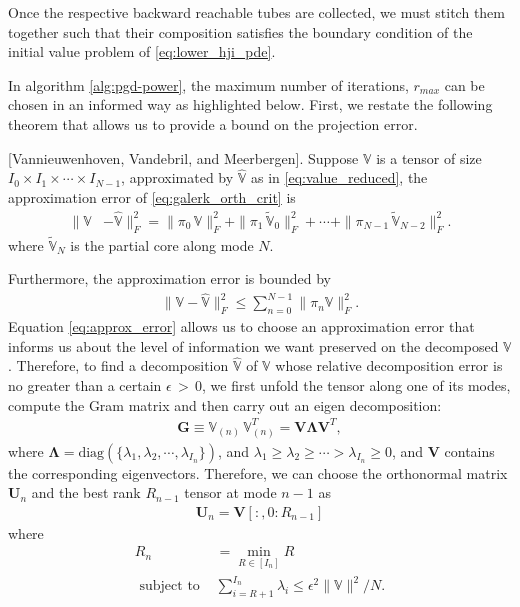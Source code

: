 Once the respective backward reachable tubes are collected, we must stitch them together such that their composition satisfies the boundary condition of the initial value problem of \eqref{eq:lower_hji_pde}. 

In algorithm \ref{alg:pgd-power}, the maximum number of iterations, $r_{max}$ can be chosen in an informed way as highlighted below. First, we restate the following theorem  that allows us to provide a bound on the projection error.
%
\begin{theorem}{[Vannieuwenhoven, Vandebril, and Meerbergen]}\cite[Th. 5.1]{VannieuwenhovenTruncate2012}. 
	Suppose $\mathds{V}$ is a tensor of size $I_0 \times I_1 \times \cdots \times I_{N-1}$, approximated by $\mathds{\hat{V}}$ as in \eqref{eq:value_reduced}, the approximation error of \eqref{eq:galerk_orth_crit} is 
	\begin{align}
		\|\mathds{V} &- \mathds{\hat{V}} \|^2_F = \| \pi_0 \, \mathds{V}  \|_F^2  + \|\pi_1 \,  \mathds{\tilde{V}}_0\|_F^2  + \cdots +\|\pi_{N-1} \,   \mathds{\tilde{V}}_{N-2} \|_F^2.
	\end{align}
	\label{theorem:hosvd}
	where $\mathds{\tilde{V}}_{N}$ is the partial core along mode $N$.
\end{theorem}
%
Furthermore, the approximation error is bounded by 
%
\begin{align}
	\| \mathds{V} - \mathds{\hat{V}} \|_F^2 \le \sum_{n = 0}^{N-1} \| \pi_n \mathds{V} \|_F^2.
	\label{eq:approx_error}
\end{align}
%
Equation \eqref{eq:approx_error} allows us to choose an approximation error that informs us about the level of information we want preserved on the decomposed $\mathds{V}$. Therefore, to  find a decomposition $\mathds{\hat{V}}$ of $\mathds{V}$ whose relative decomposition error is no greater than a certain $\epsilon\, > \,0$, we first unfold the tensor along one of its modes, compute the Gram matrix and then carry out an eigen decomposition:
%
\begin{align}
	\mathbf{G} \equiv \mathds{V}_{(n)} \, \mathds{V}_{(n)}^T = \mathbf{V} \mathbf{\Lambda} \mathbf{V}^T,
	\label{eq:eig_decomp}
\end{align}
%
where $\mathbf{\Lambda} = \text{diag}\left(\{\lambda_1, \lambda_2, \cdots, \lambda_{I_n}\}\right)$, and $\lambda_1 \ge \lambda_2 \ge \cdots > \lambda_{I_n} \ge 0$, and $\mathbf{V}$ contains the corresponding eigenvectors. Therefore, we can choose the orthonormal matrix $\mathbf{U}_n$ and the best rank   $R_{n-1}$ tensor at mode $n-1$ as 
%
\begin{align}
	\mathbf{U}_n = \mathbf{V}\left[:,0:R_{n-1}\right]  
\end{align}
%
where  
%
\begin{align}
	R_n &= \min_{R \in \left[ I_n \right]} R \nonumber \\
	\text{ subject to } &\sum_{i=R+1}^{I_n} \lambda_i \le \epsilon^2 \|\mathds{V}\|^2/N.
	\label{eq:rank_choosing}
\end{align}

